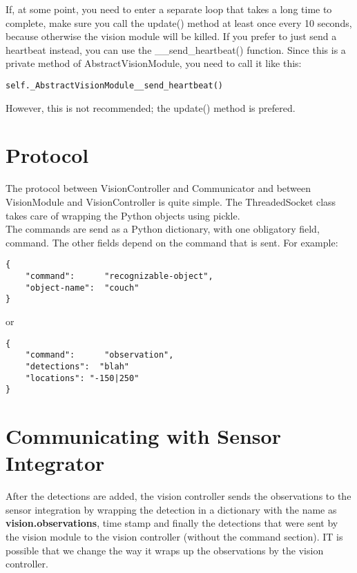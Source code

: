 \documentclass[a4paper, 10pt, oneside]{article}
\begin{document}
If, at some point, you need to enter a separate loop that takes a long time to
complete, make sure you call the update() method at least once every 10 seconds,
because otherwise the vision module will be killed. If you prefer to just send a
heartbeat instead, you can use the \_\_send\_heartbeat() function. Since this is
a private method of AbstractVisionModule, you need to call it like this:

\begin{lstlisting}
self._AbstractVisionModule__send_heartbeat()
\end{lstlisting}

However, this is not recommended; the update() method is prefered. 

\section{Protocol}
The protocol between VisionController and Communicator and between VisionModule
and VisionController is quite simple. The ThreadedSocket class takes care of
wrapping the Python objects using pickle. \\

The commands are send as a Python dictionary, with one obligatory field,
command. The other fields depend on the command that is sent. For example: \\

\begin{lstlisting}
{
    "command":      "recognizable-object",
    "object-name":  "couch"
}
\end{lstlisting}

or
 

\begin{lstlisting}
{
    "command":      "observation",
    "detections":  "blah"
    "locations": "-150|250"
}
\end{lstlisting}

\section{Communicating with Sensor Integrator}
After the detections are added, the vision controller sends the observations to
the sensor integration by wrapping the detection in a dictionary with the name
as \textbf{vision.observations}, time stamp and finally the detections that were
sent by the vision module to the vision controller (without the command
section).  IT is possible that we change the way it wraps up the observations by
the vision controller.
\end{document}
